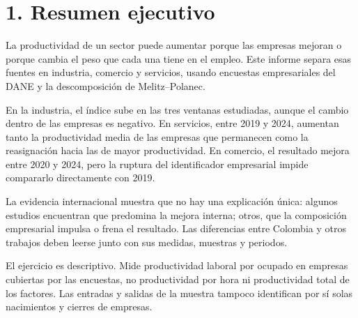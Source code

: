 \section*{1. Resumen ejecutivo}
La productividad de un sector puede aumentar porque las empresas mejoran o porque cambia el peso que cada una tiene en el empleo. Este informe separa esas fuentes en industria, comercio y servicios, usando encuestas empresariales del DANE y la descomposición de Melitz--Polanec.

En la industria, el índice sube en las tres ventanas estudiadas, aunque el cambio dentro de las empresas es negativo. En servicios, entre 2019 y 2024, aumentan tanto la productividad media de las empresas que permanecen como la reasignación hacia las de mayor productividad. En comercio, el resultado mejora entre 2020 y 2024, pero la ruptura del identificador empresarial impide compararlo directamente con 2019.

La evidencia internacional muestra que no hay una explicación única: algunos estudios encuentran que predomina la mejora interna; otros, que la composición empresarial impulsa o frena el resultado. Las diferencias entre Colombia y otros trabajos deben leerse junto con sus medidas, muestras y periodos.

El ejercicio es descriptivo. Mide productividad laboral por ocupado en empresas cubiertas por las encuestas, no productividad por hora ni productividad total de los factores. Las entradas y salidas de la muestra tampoco identifican por sí solas nacimientos y cierres de empresas.
\clearpage
